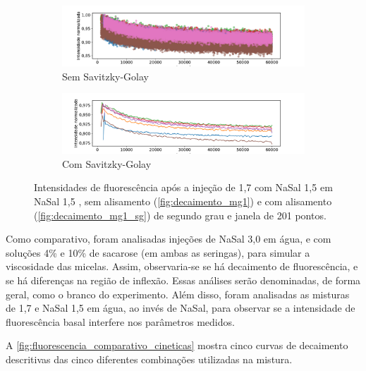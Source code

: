 	\begin{figure}[h]
		\begin{subfigure}{\textwidth}
			\centering
			\includegraphics[width=\textwidth]{imagens/fluor/decaimento_mg1}
			\caption{Sem Savitzky-Golay}
			\label{fig:decaimento_mg1}
		\end{subfigure}

		\begin{subfigure}{\textwidth}
			\centering
			\includegraphics[width=\textwidth]{imagens/fluor/decaimento_mg1_SG}
			\caption{Com Savitzky-Golay}
			\label{fig:decaimento_mg1_sg}
		\end{subfigure}
		
		\caption{Intensidades de fluorescência após a injeção de \TTAB{} 1,7 \mM{} com NaSal 1,5 \mM{} em NaSal 1,5 \mM{}, sem alisamento (\autoref{fig:decaimento_mg1}) e com alisamento (\autoref{fig:decaimento_mg1_sg}) de segundo grau e janela de 201 pontos.}
		\label{fig:decaimento_fluorescencia_mg1}
	\end{figure}	


	\FloatBarrier
	
	Como comparativo, foram analisadas injeções de NaSal 3,0 \mM{} em água, e com soluções 4\% e 10\% de sacarose (em ambas as seringas), para simular a viscosidade das micelas. Assim, observaria-se se há decaimento de fluorescência, e se há diferenças na região de inflexão. Essas análises serão denominadas, de forma geral, como o branco do experimento.  Além disso, foram analisadas as misturas de \TTAB{} 1,7 \mM{} e NaSal 1,5 \mM{} em água, ao invés de NaSal, para observar se a intensidade de fluorescência basal interfere nos parâmetros medidos.
	
	A \autoref{fig:fluorescencia_comparativo_cineticas} mostra cinco curvas de decaimento descritivas das cinco diferentes combinações utilizadas na mistura.
	
